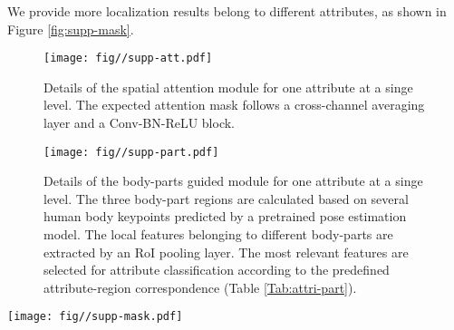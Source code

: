 \documentclass[10pt,twocolumn,letterpaper]{article}
\begin{document}
We provide more localization results belong to different attributes, as shown in Figure \ref{fig:supp-mask}.

\begin{figure}[h]
\begin{center}
  \texttt{[image: fig//supp-att.pdf]}
\end{center}
   \caption{Details of the spatial attention module for one attribute at a singe level.
   The expected attention mask follows a cross-channel averaging layer and a  Conv-BN-ReLU block.
   }
\label{fig:supp-att}
\end{figure}

\begin{figure}[t]
\begin{center}
  \texttt{[image: fig//supp-part.pdf]}
\end{center}
   \caption{Details of the body-parts guided module  for one attribute at a singe level.
   The three body-part regions are calculated based on several human body keypoints predicted by a pretrained pose estimation model.
   The local features belonging to different body-parts are extracted by an RoI pooling layer.
   The most relevant features are selected for attribute classification according to the predefined attribute-region correspondence (Table \ref{Tab:attri-part}).
   }
\label{fig:supp-part}
\end{figure}


\begin{figure*}[t]
\begin{center}
  \texttt{[image: fig//supp-mask.pdf]}
\end{center}
   \caption{Case studies of different attribute-specific localization methods for five different attributes.}
\label{fig:supp-mask}
\end{figure*}
\end{document}
